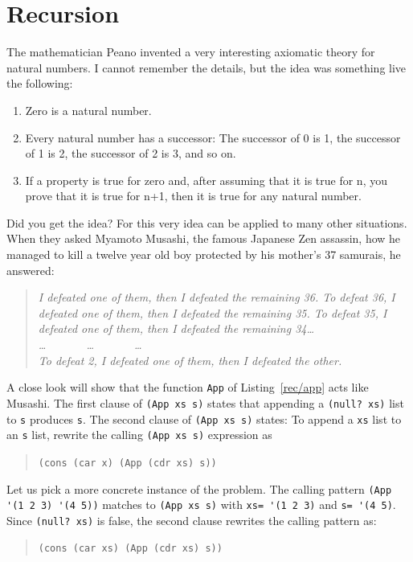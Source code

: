 \documentclass[a4paper,12pt]{book}
\begin{document}
\chapter{Recursion}\label{chapter:Recursion}
The mathematician Peano invented a very interesting axiomatic theory for
natural numbers. I cannot remember the details, but the idea was
something live the following:
\begin{enumerate}
\item Zero is a natural number.
\item Every natural number has a successor: The successor of 0 is 1, the
successor of 1 is 2, the successor of 2 is 3, and so on.
\item If a property is true for zero and, after assuming that it is true for n,
you prove that it is true for n+1, then it is true for any natural number.
\end{enumerate}
Did you get the idea? For this very idea can be applied to many other
situations. When they asked Myamoto Musashi, the famous Japanese
Zen assassin, how he managed to kill a twelve year old boy protected by his
mother's 37 samurais, he answered:
\begin{quote} \em
I defeated one of them, then I defeated
the remaining 36. To defeat 36, I defeated one of them, then I defeated
the remaining 35. To defeat 35, I defeated one of them, then I defeated the
remaining 34\ldots \\
\ldots~~~~~~~\ldots~~~~~~~\ldots\\
To defeat 2, I defeated one of them, then I defeated the other.
\end{quote}
A close look will show that 
the function 
\verb|App| of Listing~\ref{rec/app} acts like
Musashi. The first
clause of \verb|(App xs s)| states that
appending a \verb|(null? xs)| list to
\verb|s| produces \verb|s|. The second 
clause of \verb|(App xs s)|  states: To
append a \verb|xs| list to an \verb|s| list,
rewrite the calling 
\verb|(App xs s)| expression as
\begin{quote}
  \verb|(cons (car x) (App (cdr xs) s))|
\end{quote}
Let us pick a more concrete instance of the problem.
The calling pattern \verb|(App '(1 2 3) '(4 5))|
 matches to
\verb|(App xs s)|
with \verb|xs= '(1 2 3)| and \verb|s= '(4 5)|.
Since \verb|(null? xs)| is false, the second
clause rewrites the calling pattern as:
\begin{quote}
\verb|(cons (car xs) (App (cdr xs) s))|
\end{quote}
\end{document}
